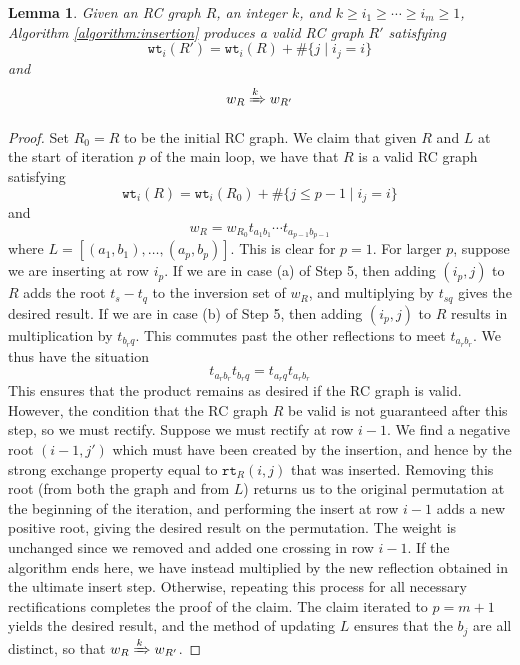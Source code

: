 \documentclass{amsart}
\newtheorem{lemma}{Lemma}[subsection]
\theoremstyle{definition}
\theoremstyle{remark}
\numberwithin{equation}{subsection}
\newcommand{\wof}[1]{w_{#1}}
\newcommand{\wtt}{\mathtt{wt}}
\newcommand{\Tom}[1]{\xRightarrow{#1}}
\newcommand{\rtt}{\mathtt{rt}}
\begin{document}
\begin{lemma} \label{lemma:insertworks}
Given an RC graph $R$, an integer $k$, and $k\geq i_1\geq\cdots\geq i_m\geq 1$, Algorithm \ref{algorithm:insertion} produces a valid RC graph $R'$ satisfying
$$\wtt_i(R') = \wtt_i(R) + \#\{j \mid i_j = i\}$$
and
$$\wof{R}\Tom{k} \wof{R'}$$
\end{lemma}
\begin{proof}
Set $R_0=R$ to be the initial RC graph. We claim that given $R$ and $L$ at the start of iteration $p$ of the main loop, we have that $R$ is a valid RC graph satisfying
$$\wtt_i(R) = \wtt_i(R_0) + \#\{j \leq p-1 \mid i_j = i\}$$
and
$$\wof{R} = \wof{R_0}t_{a_1b_1}\cdots t_{a_{p-1}b_{p-1}}$$
where $L=[(a_1,b_1),\ldots,(a_p,b_p)]$. This is clear for $p=1$. For larger $p$, suppose we are inserting at row $i_p$. If we are in case (a) of Step 5, then adding $(i_p,j)$ to $R$ adds the root $t_s - t_q$ to the inversion set of $\wof{R}$, and multiplying by $t_{sq}$ gives the desired result. If we are in case (b) of Step 5, then adding $(i_p,j)$ to $R$ results in multiplication by $t_{b_rq}$. This commutes past the other reflections to meet $t_{a_rb_r}$. We thus have the situation
$$t_{a_rb_r}t_{b_rq} = t_{a_rq}t_{a_rb_r}$$
This ensures that the product remains as desired if the RC graph is valid. However, the condition that the RC graph $R$ be valid is not guaranteed after this step, so we must rectify. Suppose we must rectify at row $i - 1$. We find a negative root $(i-1, j')$ which must have been created by the insertion, and hence by the strong exchange property equal to $\rtt_R(i, j)$ that was inserted. Removing this root (from both the graph and from $L$) returns us to the original permutation at the beginning of the iteration, and performing the insert at row $i-1$ adds a new positive root, giving the desired result on the permutation. The weight is unchanged since we removed and added one crossing in row $i-1$. If the algorithm ends here, we have instead multiplied by the new reflection obtained in the ultimate insert step. Otherwise, repeating this process for all necessary rectifications completes the proof of the claim. The claim iterated to $p=m+1$ yields the desired result, and the method of updating $L$ ensures that the $b_j$ are all distinct, so that $\wof{R}\Tom{k} \wof{R'}$.
\end{proof}
\end{document}
